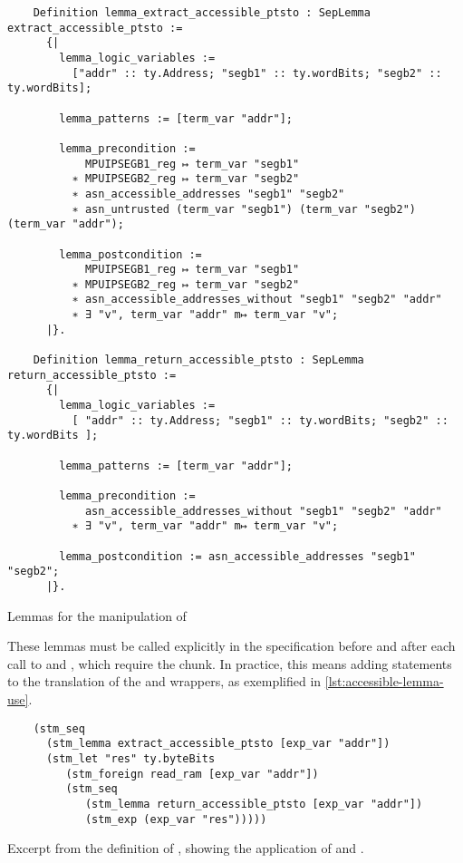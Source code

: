 \begin{listing}
  \begin{verbatim}
    Definition lemma_extract_accessible_ptsto : SepLemma extract_accessible_ptsto :=
      {|
        lemma_logic_variables :=
          ["addr" :: ty.Address; "segb1" :: ty.wordBits; "segb2" :: ty.wordBits];

        lemma_patterns := [term_var "addr"];

        lemma_precondition :=
            MPUIPSEGB1_reg ↦ term_var "segb1"
          ∗ MPUIPSEGB2_reg ↦ term_var "segb2"
          ∗ asn_accessible_addresses "segb1" "segb2"
          ∗ asn_untrusted (term_var "segb1") (term_var "segb2") (term_var "addr");

        lemma_postcondition :=
            MPUIPSEGB1_reg ↦ term_var "segb1"
          ∗ MPUIPSEGB2_reg ↦ term_var "segb2"
          ∗ asn_accessible_addresses_without "segb1" "segb2" "addr"
          ∗ ∃ "v", term_var "addr" m↦ term_var "v";
      |}.

    Definition lemma_return_accessible_ptsto : SepLemma return_accessible_ptsto :=
      {|
        lemma_logic_variables :=
          [ "addr" :: ty.Address; "segb1" :: ty.wordBits; "segb2" :: ty.wordBits ];

        lemma_patterns := [term_var "addr"];

        lemma_precondition :=
            asn_accessible_addresses_without "segb1" "segb2" "addr"
          ∗ ∃ "v", term_var "addr" m↦ term_var "v";

        lemma_postcondition := asn_accessible_addresses "segb1" "segb2";
      |}.
  \end{verbatim}
  \caption{Lemmas for the manipulation of }
  \label{lst:accessible-lemmas}
\end{listing}

These lemmas must be called explicitly in the \usail specification before and after each call to  and , which require the  chunk. In practice, this means adding  statements to the translation of the  and  wrappers, as exemplified in \cref{lst:accessible-lemma-use}.

\begin{listing}
  \begin{verbatim}
    (stm_seq
      (stm_lemma extract_accessible_ptsto [exp_var "addr"])
      (stm_let "res" ty.byteBits
         (stm_foreign read_ram [exp_var "addr"])
         (stm_seq
            (stm_lemma return_accessible_ptsto [exp_var "addr"])
            (stm_exp (exp_var "res")))))
  \end{verbatim}
  \caption{Excerpt from the \usail definition of , showing the application of  and .}
  \label{lst:accessible-lemma-use}
\end{listing}

